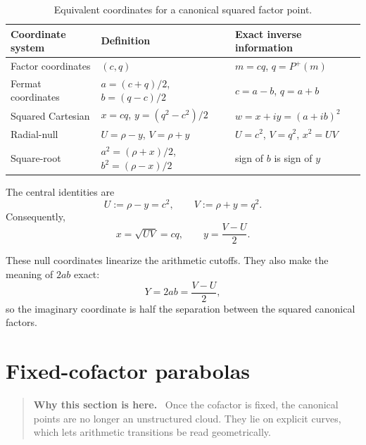 \documentclass[11pt]{article}
\theoremstyle{definition}
\theoremstyle{remark}
\newcommand{\Pplus}{P^{+}}
\newcommand{\1}{\mathbf{1}}
\newenvironment{motivation}
  {\begin{quote}\small\color{ovvogray}\textbf{Why this section is here.}\ }
  {\end{quote}}
\begin{document}
\begin{table}[htbp]
\centering
\caption{Equivalent coordinates for a canonical squared factor point.}
\label{tab:coordinates}
\renewcommand{\arraystretch}{1.35}
\begin{tabular}{>{\raggedright\arraybackslash}p{} >{\raggedright\arraybackslash}p{} >{\raggedright\arraybackslash}p{}}
\toprule
Coordinate system & Definition & Exact inverse information\\
\midrule
Factor coordinates & $(c,q)$ & $m=cq$, $q=\Pplus(m)$\\
Fermat coordinates & $a=(c+q)/2$, $b=(q-c)/2$ & $c=a-b$, $q=a+b$\\
Squared Cartesian & $x=cq$, $y=(q^2-c^2)/2$ & $w=x+iy=(a+ib)^2$\\
Radial-null & $U=\rho-y$, $V=\rho+y$ & $U=c^2$, $V=q^2$, $x^2=UV$\\
Square-root & $a^2=(\rho+x)/2$, $b^2=(\rho-x)/2$ & sign of $b$ is sign of $y$\\
\bottomrule
\end{tabular}
\end{table}

The central identities are
\begin{equation}
 \boxed{
 U:=\rho-y=c^2,
 \qquad
 V:=\rho+y=q^2.
 }
 \label{eq:UV}
\end{equation}
Consequently,
\begin{equation}
 x=\sqrt{UV}=cq,
 \qquad
 y=\frac{V-U}{2}.
 \label{eq:xy-UV}
\end{equation}

These null coordinates linearize the arithmetic cutoffs.  They also make the meaning of $2ab$ exact:
\begin{equation}
 \boxed{Y=2ab=\frac{V-U}{2},}
 \label{eq:Y-null}
\end{equation}
so the imaginary coordinate is half the separation between the squared canonical factors.

\section{Fixed-cofactor parabolas}
\label{sec:cofactor-curves}

\begin{motivation}
Once the cofactor is fixed, the canonical points are no longer an unstructured cloud.  They lie on explicit curves, which lets arithmetic transitions be read geometrically.
\end{motivation}
\end{document}
